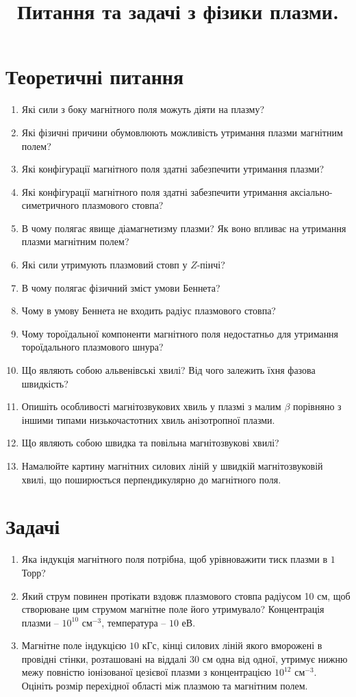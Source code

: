 \documentclass{article}
\title{Питання та задачі з фізики плазми.}
\author{}
\date{}
\begin{document}
\maketitle

\section{Теоретичні питання}

\begin{enumerate}
    \item Які сили з боку магнітного поля можуть діяти на плазму?
    \item Які фізичні причини обумовлюють можливість утримання плазми магнітним полем?
    \item Які конфігурації магнітного поля здатні забезпечити утримання плазми?
    \item Які конфігурації магнітного поля здатні забезпечити утримання аксіально-симетричного плазмового стовпа?
    \item В чому полягає явище діамагнетизму плазми? Як воно впливає на утримання плазми магнітним полем?
    \item Які сили утримують плазмовий стовп у $Z$-пінчі?
    \item В чому полягає фізичний зміст умови Беннета?
    \item Чому в умову Беннета не входить радіус плазмового стовпа?
    \item Чому тороїдальної компоненти магнітного поля недостатньо для утримання тороїдального плазмового шнура?
    \item Що являють собою альвенівські хвилі? Від чого залежить їхня фазова швидкість?
    \item Опишіть особливості магнітозвукових хвиль у плазмі з малим $\beta$ порівняно з іншими типами низькочастотних хвиль анізотропної плазми.
    \item Що являють собою швидка та повільна магнітозвукові хвилі?
    \item Намалюйте картину магнітних силових ліній у швидкій магнітозвуковій хвилі, що поширюється перпендикулярно до магнітного поля.
\end{enumerate}

\section{Задачі}

\begin{enumerate}
    \item Яка індукція магнітного поля потрібна, щоб урівноважити тиск плазми в $1$ Торр?
    \item Який струм повинен протікати вздовж плазмового стовпа радіусом 10 см, щоб створюване цим струмом магнітне поле його утримувало? Концентрація плазми -- $10^{10}$ см$^{-3}$, температура -- $10$ еВ.
    \item Магнітне поле індукцією $10$ кГс, кінці силових ліній якого вморожені в провідні стінки, розташовані на віддалі 30 см одна від одної, утримує нижню межу повністю іонізованої цезієвої плазми з концентрацією $10^{12}$ см$^{-3}$. Оцініть розмір перехідної області між плазмою та магнітним полем.
\end{enumerate}
\end{document}
